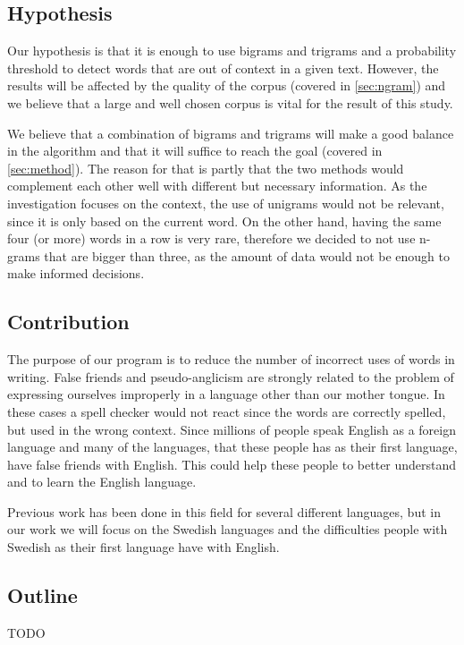 \documentclass[a4paper,12pt]{article}
\begin{document}
\subsection{Hypothesis}
Our hypothesis is that it is enough to use bigrams and trigrams and a probability threshold to detect words that are out of context in a given text. However, the results will be affected by the quality of the corpus (covered in \ref{sec:ngram}) and we believe that a large and well chosen corpus is vital for the result of this study.

We believe that a combination of bigrams and trigrams will make a good balance in the algorithm and that it will suffice to reach the goal (covered in \ref{sec:method}). The reason for that is partly that the two methods would complement each other well with different but necessary information. As the investigation focuses on the context, the use of unigrams would not be relevant, since it is only based on the current word. On the other hand, having the same four (or more) words in a row is very rare, therefore we decided to not use n-grams that are bigger than three, as the amount of data would not be enough to make informed decisions.

\subsection{Contribution}
\label{sec:contribution}
The purpose of our program is to reduce the number of incorrect uses of  words in writing. False friends and pseudo-anglicism are strongly related to the problem of expressing ourselves improperly in a language other than our mother tongue. In these cases a spell checker would not react since the words are correctly spelled, but used in the wrong context. Since millions of people speak English as a foreign language and many of the languages, that these people has as their first language, have false friends with English. This could help these people to better understand and to learn the English language. 

Previous work has been done in this field for several different languages, but in our work we will focus on the Swedish languages and the difficulties people with Swedish as their first language have with English.

\subsection{Outline}
\label{sec:outline}
TODO
\end{document}

